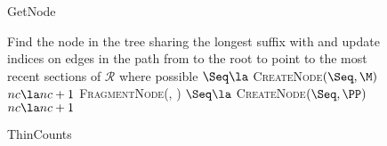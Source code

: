 \begin{figure*}[ttt!]
\begin{minipage}[t]{.48\linewidth}
\end{minipage}
	\hfill
%
%
%		
%		
%	
	\begin{minipage}[t]{.48\linewidth}
\begin{algorithm}[H]
	\caption{GetNode} \label{alg:getnode}
	\begin{algorithmic}[1]
		\State Find the node \M \space in the tree sharing the longest suffix with \Seq \space and update indices on edges in the path from \M \space to the root to point to the most recent sections of $\mathcal{R}$ where possible
				\State $\Seq \la$ \textsc{CreateNode}$(\Seq, \M)$
				\State $nc \la nc + 1$
			\EndIf
		\Else
			\State \PP \la \space \textsc{FragmentNode}(\M, \Seq)
			\State $\Seq \la $ \textsc{CreateNode}$(\Seq, \PP)$
			\State $nc \la nc + 1$
		\EndIf
	\EndFunction
	\end{algorithmic}	
\end{algorithm}
\vspace{-.75cm}
\begin{algorithm}[H]
	\caption{ThinCounts} \label{alg:thincounts}
	\begin{algorithmic}[1]
			

\end{algorithmic}
\end{algorithm}
\end{minipage}
\end{figure*}
